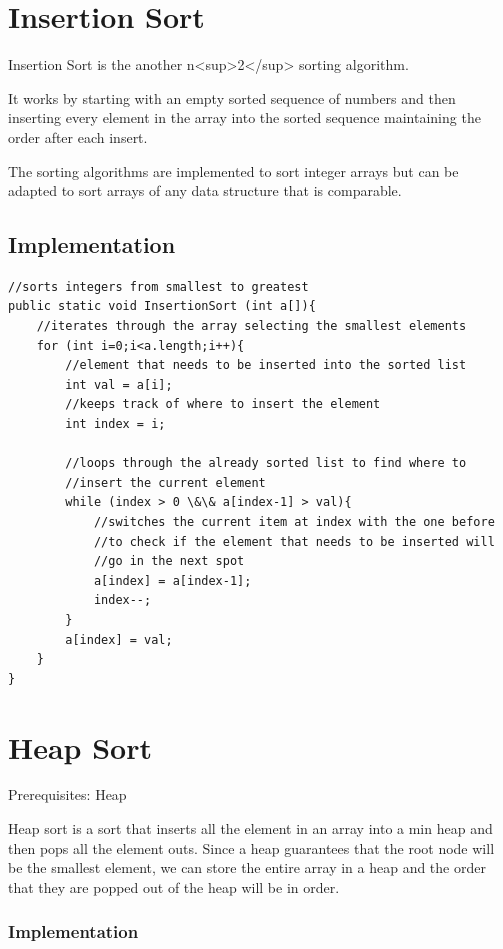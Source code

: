 \documentclass[11pt,oneside]{book}
\begin{document}
\section{Insertion Sort}

Insertion Sort is the another n<sup>2</sup> sorting algorithm.

It works by starting with an empty sorted sequence of numbers and then inserting every element in the array into the sorted sequence maintaining the order after each insert.

The sorting algorithms are implemented to sort integer arrays but can be adapted to sort arrays of any data structure that is comparable.

\subsection{Implementation}

\begin{lstlisting}
//sorts integers from smallest to greatest
public static void InsertionSort (int a[]){
    //iterates through the array selecting the smallest elements
    for (int i=0;i<a.length;i++){
        //element that needs to be inserted into the sorted list
        int val = a[i]; 
        //keeps track of where to insert the element
        int index = i; 
        
        //loops through the already sorted list to find where to 
        //insert the current element
        while (index > 0 \&\& a[index-1] > val){
            //switches the current item at index with the one before 
            //to check if the element that needs to be inserted will 
            //go in the next spot
            a[index] = a[index-1];
            index--;
        }
        a[index] = val;
    }
}
\end{lstlisting}
\section{Heap Sort}

Prerequisites: Heap

Heap sort is a sort that inserts all the element in an array into a min heap and then pops all the element outs. Since a heap guarantees that the root node will be the smallest element, we can store the entire array in a heap and the order that they are popped out of the heap will be in order.

\subsubsection{Implementation}
\end{document}

